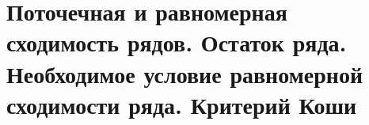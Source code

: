 \section{Поточечная и равномерная сходимость рядов. Остаток ряда. Необходимое условие равномерной сходимости ряда. Критерий Коши}
